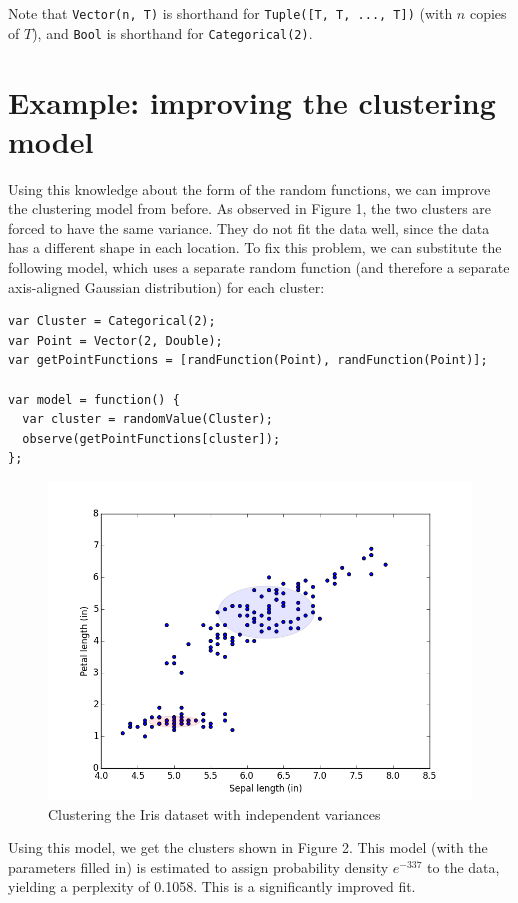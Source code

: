 \documentclass{article}
\begin{document}
  Note that \texttt{Vector(n, T)} is shorthand for \texttt{Tuple([T, T, ..., T])} (with $n$ copies of $T$),
  and \texttt{Bool} is shorthand for \texttt{Categorical(2)}.

  \section{Example: improving the clustering model}
  Using this knowledge about the form of the random functions, we can improve the clustering model from before.
  As observed in Figure 1, the two clusters are forced to have the
  same variance. They do not fit the data well, since the data has a different
  shape in each location.  To fix this problem, we can substitute the following
  model, which uses a separate random function (and therefore a separate axis-aligned Gaussian distribution) for each cluster:
  \begin{lstlisting}
var Cluster = Categorical(2);
var Point = Vector(2, Double);
var getPointFunctions = [randFunction(Point), randFunction(Point)];

var model = function() {
  var cluster = randomValue(Cluster);
  observe(getPointFunctions[cluster]);
};
\end{lstlisting}
  \begin{figure}[h]
  \begin{center}
    \includegraphics[scale=0.5]{../plots/irisclusters_indep.png}
  \end{center}
  \caption{Clustering the Iris dataset with independent variances}
\end{figure}
  Using this model, we get the clusters shown in Figure 2.
  This model (with the parameters filled in) is estimated to assign probability density $e^{-337}$ to the data, yielding a perplexity of 0.1058.  This is a significantly improved fit.
\end{document}
